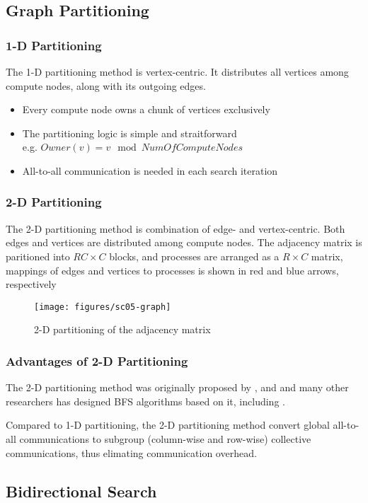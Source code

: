 \documentclass[]{beamer}
\begin{document}
\subsection{Graph Partitioning}

\begin{frame}
  \frametitle{1-D Partitioning}
  The 1-D partitioning method is vertex-centric. It distributes all vertices among
  compute nodes, along with its outgoing edges.
  \begin{itemize}
    \item Every compute node owns a chunk of vertices exclusively
    \item The partitioning logic is simple and straitforward\\
      e.g. $Owner(v) = v \mod NumOfComputeNodes$
    \item All-to-all communication is needed in each search iteration
  \end{itemize}
\end{frame}

\begin{frame}
  \frametitle{2-D Partitioning}
  The 2-D partitioning method is combination of edge- and vertex-centric.
  Both edges and vertices are distributed among compute nodes.
  The adjacency matrix is paritioned into
  $RC \times C$ blocks, and processes are arranged as a $R \times C$ matrix, mappings of edges and vertices
  to processes is shown in red and blue arrows, respectively
  \begin{figure}
    \texttt{[image: figures/sc05-graph]}
    \caption{2-D partitioning of the adjacency matrix}
  \end{figure}
\end{frame}

\begin{frame}
  \frametitle{Advantages of 2-D Partitioning}
  The 2-D partitioning method was originally proposed by \cite{Yoo2005}, and 
  and many other researchers has designed BFS algorithms based on it,
  including \cite{Bulucc2011}.

  Compared to 1-D partitioning, the 2-D partitioning
  method convert global all-to-all communications to subgroup (column-wise and
  row-wise) collective communications, thus elimating communication overhead.  
\end{frame}

\subsection{Bidirectional Search}
\end{document}
